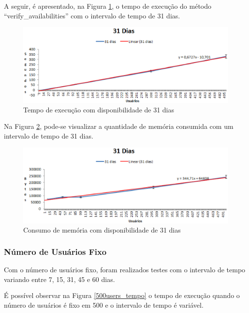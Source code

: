 A seguir, é apresentado, na Figura \ref{31dias_tempo}, o tempo de execução do método ``verify\_availabilities'' com o intervalo de tempo de 31 dias.

\newpage

\begin{figure}[!h]
	\centering
	\includegraphics[scale=0.8]{figuras/resultados/graficos/31_dias_tempo.eps}
	\caption[Tempo de execução com disponibilidade de 31 dias]{Tempo de execução com disponibilidade de 31 dias}
	\label{31dias_tempo}
\end{figure}

Na Figura \ref{31dias_memoria}, pode-se visualizar a quantidade de memória consumida com um intervalo de tempo de 31 dias.

\begin{figure}[!h]
	\centering
	\includegraphics[scale=0.8]{figuras/resultados/graficos/31_dias_memo.eps}
	\caption[Consumo de memória com disponibilidade de 31 dias]{Consumo de memória com disponibilidade de 31 dias}
	\label{31dias_memoria}
\end{figure}

\subsubsection{Número de Usuários Fixo}

Com o número de usuários fixo, foram realizados testes com o intervalo de tempo variando entre 7, 15, 31, 45 e 60 dias.

É possível observar na Figura \ref{500users_tempo} o tempo de execução quando o número de usuários é fixo em 500 e o intervalo de tempo é variável.

